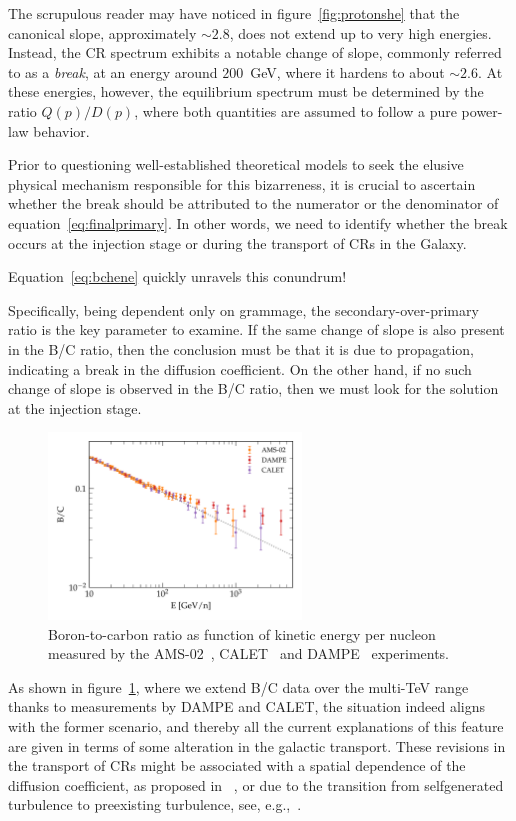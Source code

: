 The scrupulous reader may have noticed in figure~\ref{fig:protonshe} that the canonical slope, approximately $\sim 2.8$, does not extend up to very high energies. Instead, the CR spectrum exhibits a notable change of slope, commonly referred to as a \emph{break}, at an energy around $200$~GeV, where it hardens to about $\sim 2.6$.
%
At these energies, however, the equilibrium spectrum must be determined by the ratio $Q(p)/D(p)$, where both quantities are assumed to follow a pure power-law behavior. 

Prior to questioning well-established theoretical models to seek the elusive physical mechanism responsible for this bizarreness, it is crucial to ascertain whether the break should be attributed to the numerator or the denominator of equation~\eqref{eq:finalprimary}. 
%
In other words, we need to identify whether the break occurs at the injection stage or during the transport of CRs in the Galaxy.

Equation~\eqref{eq:bchene} quickly unravels this conundrum! 

Specifically, being dependent only on grammage, the secondary-over-primary ratio is the key parameter to examine. 
%
If the same change of slope is also present in the B/C ratio, then the conclusion must be that it is due to propagation, indicating a break in the diffusion coefficient. On the other hand, if no such change of slope is observed in the B/C ratio, then we must look for the solution at the injection stage.

\begin{figure}
\centering
\includegraphics[width=0.6\textwidth]{figures/BC_highenergy.pdf}
\caption{Boron-to-carbon ratio as function of kinetic energy per nucleon measured by the AMS-02~\cite{AMS02results}, CALET~\cite{CALET.2022.BC} and DAMPE~\cite{DAMPE.2022.BC} experiments.}
\label{fig:bchighen}
\end{figure}

As shown in figure~\ref{fig:bchighen}, where we extend B/C data over the multi-TeV range thanks to measurements by DAMPE and CALET, the situation indeed aligns with the former scenario, and thereby all the current explanations of this feature are given in terms of some alteration in the galactic transport. 
%
These revisions in the transport of CRs might be associated with a spatial dependence of the diffusion coefficient, as proposed in ~\cite{Tomassetti2012apj}, or due to the transition from selfgenerated turbulence to preexisting turbulence, see, e.g.,~\cite{Evoli2018prl}.

